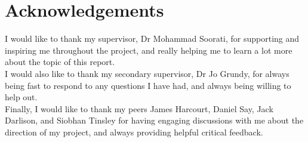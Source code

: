 \documentclass[12pt,a4paper,twoside]{report}
\begin{document}
	
	
	\chapter*{Acknowledgements}
	I would like to thank my supervisor, Dr Mohammad Soorati, for supporting and inspiring me throughout the project, and really helping me to learn a lot more about the topic of this report.\\
	
	I would also like to thank my secondary supervisor, Dr Jo Grundy, for always being fast to respond to any questions I have had, and always being willing to help out.\\
	
	Finally, I would like to thank my peers James Harcourt, Daniel Say, Jack Darlison, and Siobhan Tinsley for having engaging discussions with me about the direction of my project, and always providing helpful critical feedback.
	
	\tableofcontents
	
	

	
	
	
	
	
	
	
	
	
	
	
	
	
	
	
	{}
	
	
	
\end{document}
